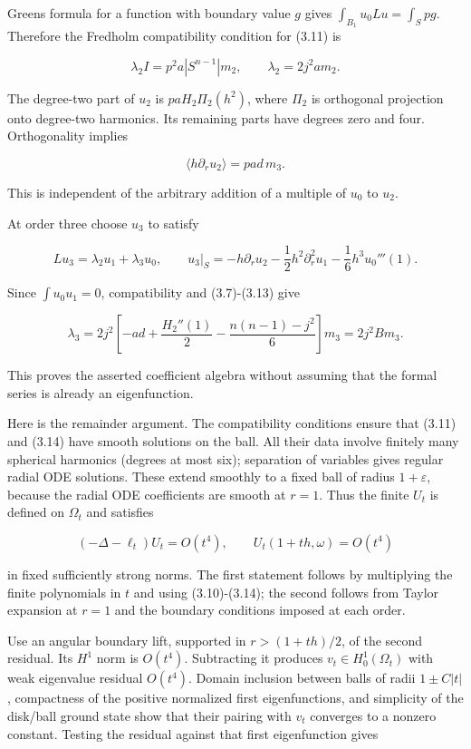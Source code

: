 \documentclass[11pt]{article}
\begin{document}
Green\textquotesingle s formula for a function with boundary value \(g\)
gives \(\int_{B_1}u_0 Lu=\int_S pg\). Therefore the Fredholm
compatibility condition for (3.11) is

\[
\lambda_2 I=p^2a|S^{n-1}|m_2,
\qquad \lambda_2=2j^2a m_2.
\tag{3.12}
\]

The degree-two part of \(u_2\) is \(paH_2\Pi_2(h^2)\), where \(\Pi_2\)
is orthogonal projection onto degree-two harmonics. Its remaining parts
have degrees zero and four. Orthogonality implies

\[
\langle h\partial_ru_2\rangle=pa d\,m_3.
\tag{3.13}
\]

This is independent of the arbitrary addition of a multiple of \(u_0\)
to \(u_2\).

At order three choose \(u_3\) to satisfy

\[
Lu_3=\lambda_2u_1+\lambda_3u_0,\qquad
u_3|_S=-h\partial_ru_2-\frac12h^2\partial_r^2u_1
-\frac16h^3u_0'''(1).
\tag{3.14}
\]

Since \(\int u_0u_1=0\), compatibility and (3.7)-(3.13) give

\[
\lambda_3=2j^2\left[-ad+\frac{H_2''(1)}2
-\frac{n(n-1)-j^2}{6}\right]m_3=2j^2B m_3.
\tag{3.15}
\]

This proves the asserted coefficient algebra without assuming that the
formal series is already an eigenfunction.

Here is the remainder argument. The compatibility conditions ensure that
(3.11) and (3.14) have smooth solutions on the ball. All their data
involve finitely many spherical harmonics (degrees at most six);
separation of variables gives regular radial ODE solutions. These extend
smoothly to a fixed ball of radius \(1+\varepsilon\), because the radial
ODE coefficients are smooth at \(r=1\). Thus the finite \(U_t\) is
defined on \(\Omega_t\) and satisfies

\[
(-\Delta-\ell_t)U_t=O(t^4),\qquad
U_t(1+th,\omega)=O(t^4)
\tag{3.16}
\]

in fixed sufficiently strong norms. The first statement follows by
multiplying the finite polynomials in \(t\) and using (3.10)-(3.14); the
second follows from Taylor expansion at \(r=1\) and the boundary
conditions imposed at each order.

Use an angular boundary lift, supported in \(r>(1+th)/2\), of the second
residual. Its \(H^1\) norm is \(O(t^4)\). Subtracting it produces
\(v_t\in H^1_0(\Omega_t)\) with weak eigenvalue residual \(O(t^4)\).
Domain inclusion between balls of radii \(1\pm C|t|\), compactness of
the positive normalized first eigenfunctions, and simplicity of the
disk/ball ground state show that their pairing with \(v_t\) converges to
a nonzero constant. Testing the residual against that first
eigenfunction gives
\end{document}
